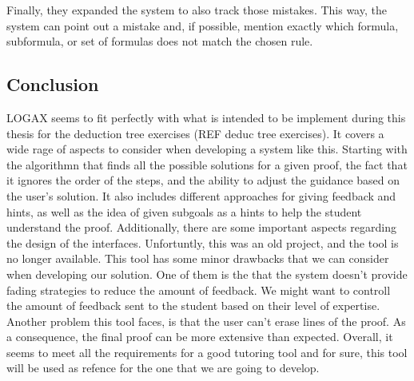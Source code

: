 Finally, they expanded the system to also track those mistakes. This way, the system can point out a mistake and, if possible, mention exactly which formula, subformula, or set of formulas does not match the chosen rule.

\subsection{Conclusion}
LOGAX seems to fit perfectly with what is intended to be implement during this thesis for the deduction tree exercises (REF deduc tree exercises). It covers a wide rage of aspects to consider when developing a system like this. Starting with the algorithmn that finds all the possible solutions for a given proof, the fact that it ignores the order of the steps, and the ability to adjust the guidance based on the user's solution. It also includes different approaches for giving feedback and hints, as well as the idea of given subgoals as a hints to help the student understand the proof. Additionally, there are some important aspects regarding the design of the interfaces. 
Unfortuntly, this was an old project, and the tool is no longer available. This tool has some minor drawbacks that we can consider when developing our solution. One of them is the that the system doesn't provide fading strategies to reduce the amount of feedback. We might want to controll the amount of feedback sent to the student based on their level of expertise. Another problem this tool faces, is that the user can't erase lines of the proof. As a consequence, the final proof can be more extensive than expected. Overall, it seems to meet all the requirements for a good tutoring tool and for sure, this tool will be used as refence for the one that we are going to develop.

